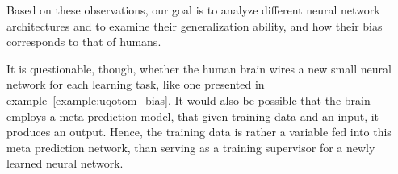 \documentclass[../../main.tex]{subfiles}
\begin{document}
    Based on these observations, our goal is to analyze different neural network architectures and to examine their generalization ability, and how their bias corresponds to that of humans.

    \begin{remark}
        It is questionable, though, whether the human brain wires a new small neural network for each learning task, like one presented in example~\ref{example:uqotom_bias}. It would also be possible that the brain employs a meta prediction model, that given training data and an input, it produces an output. Hence, the training data is rather a variable fed into this meta prediction network, than serving as a training supervisor for a newly learned neural network.
    \end{remark}
\end{document}
